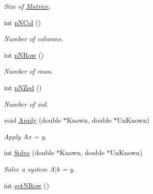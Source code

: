 \begin{DoxyCompactItemize}
\begin{DoxyCompactList}\small\item\em Size of \hyperlink{classMatrice}{Matrice}. \end{DoxyCompactList}\item 
int \hyperlink{classMatrice_a8ff9da924c6e0d9cd89d650869b33c39}{p\+N\+Col} ()\hypertarget{classMatrice_a8ff9da924c6e0d9cd89d650869b33c39}{}\label{classMatrice_a8ff9da924c6e0d9cd89d650869b33c39}

\begin{DoxyCompactList}\small\item\em Number of columns. \end{DoxyCompactList}\item 
int \hyperlink{classMatrice_afd2c17a1b2a30f474d509fb9353e2f86}{p\+N\+Row} ()\hypertarget{classMatrice_afd2c17a1b2a30f474d509fb9353e2f86}{}\label{classMatrice_afd2c17a1b2a30f474d509fb9353e2f86}

\begin{DoxyCompactList}\small\item\em Number of rows. \end{DoxyCompactList}\item 
int \hyperlink{classMatrice_a201f7fc580e93bfd6b92301be8c82d40}{p\+N\+Zed} ()\hypertarget{classMatrice_a201f7fc580e93bfd6b92301be8c82d40}{}\label{classMatrice_a201f7fc580e93bfd6b92301be8c82d40}

\begin{DoxyCompactList}\small\item\em Number of zed. \end{DoxyCompactList}\item 
void \hyperlink{classMatrice_a3a63b6cadfd2cd5c3010892ca1a78d6d}{Apply} (double $\ast$Known, double $\ast$Un\+Known)\hypertarget{classMatrice_a3a63b6cadfd2cd5c3010892ca1a78d6d}{}\label{classMatrice_a3a63b6cadfd2cd5c3010892ca1a78d6d}

\begin{DoxyCompactList}\small\item\em Apply Ax = y. \end{DoxyCompactList}\item 
int \hyperlink{classMatrice_a660450c11d8e8ec196d63da73323a7cd}{Solve} (double $\ast$Known, double $\ast$Un\+Known)\hypertarget{classMatrice_a660450c11d8e8ec196d63da73323a7cd}{}\label{classMatrice_a660450c11d8e8ec196d63da73323a7cd}

\begin{DoxyCompactList}\small\item\em Solve a system A$\vert$b = y. \end{DoxyCompactList}\item 
int \hyperlink{classMatrice_a239681f05803501801eb5eb6db082453}{get\+N\+Row} ()\hypertarget{classMatrice_a239681f05803501801eb5eb6db082453}{}\label{classMatrice_a239681f05803501801eb5eb6db082453}


\end{DoxyCompactItemize}
